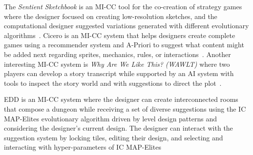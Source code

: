 The \emph{Sentient Sketchbook} is an MI-CC tool for the co-creation of strategy games where the designer focused on creating low-resolution sketches, and the computational designer suggested variations generated with different evolutionary algorithms~\cite{p8Liapis2013-sentientsketchbook}. Cicero is an MI-CC system that helps designers create complete games using a recommender system and A-Priori to suggest what content might be added next regarding sprites, mechanics, rules, or interactions~\cite{p8machado2019pitako}. Another interesting MI-CC system is \emph{Why Are We Like This? (WAWLT)} where two players can develop a story transcript while supported by an AI system with tools to inspect the story world and with suggestions to direct the plot~\cite{p8Kreminski2020-WAWLT}.


EDD is an MI-CC system where the designer can create interconnected rooms that compose a dungeon while receiving a set of diverse suggestions using the IC MAP-Elites evolutionary algorithm driven by level design patterns and considering the designer's current design. The designer can interact with the suggestion system by locking tiles, editing their design, and selecting and interacting with hyper-parameters of IC MAP-Elites~\cite{p8Alvarez2018a,Alvarez2020-ICMAPE}






